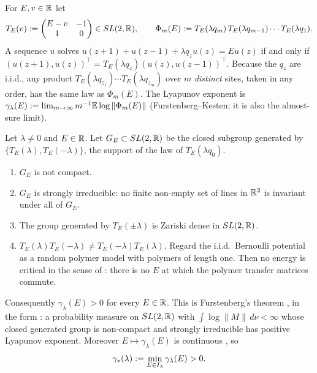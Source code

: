 For $E,v\in\mathbb{R}$ let
\begin{equation}\label{eq:transfer}
  T_E(v):=\begin{pmatrix}E-v&-1\\1&0\end{pmatrix}\in SL(2,\mathbb{R}),\qquad
  \Phi_m(E):=T_E(\lambda q_m)\,T_E(\lambda q_{m-1})\cdots T_E(\lambda q_1).
\end{equation}
A sequence $u$ solves $u(z+1)+u(z-1)+\lambda q_zu(z)=Eu(z)$ if and only if
$(u(z+1),u(z))^{\!\top}=T_E(\lambda q_z)(u(z),u(z-1))^{\!\top}$.  Because the $q_z$ are i.i.d., any
product $T_E(\lambda q_{z_1})\cdots T_E(\lambda q_{z_m})$ over $m$ \emph{distinct} sites, taken in any
order, has the same law as $\Phi_m(E)$.  The Lyapunov exponent is
$\gamma_\lambda(E):=\lim_{m\to\infty}m^{-1}\mathbb{E}\log\|\Phi_m(E)\|$ (Furstenberg--Kesten; it is also the
almost-sure limit).

\begin{proposition}\label{prop:nocritical}
Let $\lambda\neq0$ and $E\in\mathbb{R}$.  Let $G_E\subset SL(2,\mathbb{R})$ be the closed subgroup generated by
$\{T_E(\lambda),T_E(-\lambda)\}$, the support of the law of $T_E(\lambda q_0)$.
\begin{enumerate}[label=(\roman*)]
\item $G_E$ is not compact.
\item $G_E$ is strongly irreducible: no finite non-empty set of lines in $\mathbb{R}^2$ is invariant under all of $G_E$.
\item The group generated by $T_E(\pm\lambda)$ is Zariski dense in $SL(2,\mathbb{R})$.
\item $T_E(\lambda)T_E(-\lambda)\ne T_E(-\lambda)T_E(\lambda)$.  Regard the i.i.d.\ Bernoulli potential as
a random polymer model with polymers of length one.  Then no energy is critical in the sense of
\cite[Def.~1]{JSBS2003}: there is no $E$ at which the polymer transfer matrices commute.
\end{enumerate}
Consequently $\gamma_\lambda(E)>0$ for every $E\in\mathbb{R}$.  This is Furstenberg's theorem
\cite[Thm.~8.6]{Furstenberg1963}, in the form \cite[Thm.~2.1]{Bucaj2019}: a probability measure on
$SL(2,\mathbb{R})$ with $\int\log\|M\|\,d\nu<\infty$ whose closed generated group is non-compact and strongly
irreducible has positive Lyapunov exponent.  Moreover $E\mapsto\gamma_\lambda(E)$ is continuous
\cite[Thm.~2.6]{Bucaj2019}, so
\begin{equation}\label{eq:gstar}
  \gamma_*(\lambda):=\min_{E\in I_\lambda}\gamma_\lambda(E)>0 .
\end{equation}
\end{proposition}

